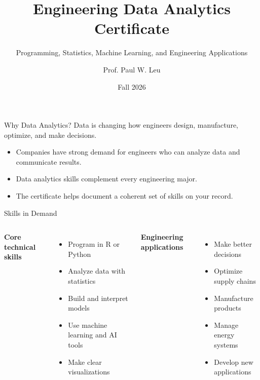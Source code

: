 \documentclass[aspectratio=169,11pt,t]{beamer}
\title[Engineering Data Analytics Certificate]{Engineering Data Analytics Certificate}
\subtitle{Programming, Statistics, Machine Learning, and Engineering Applications}
\author{Prof. Paul W. Leu}
\institute{University of Pittsburgh}
\date{Fall 2026}
\newcommand{\smallitem}{\setlength\itemsep{2pt}}
\newcommand{\tightitems}{\setlength\itemsep{1pt}\setlength\parskip{0pt}}
\begin{document}
\begin{frame}[t]
  \titlepage
\end{frame}

\begin{frame}[t]{Why Data Analytics?}
\large
Data is changing how engineers design, manufacture, optimize, and make decisions.

\vspace{0.35cm}
\begin{itemize}[<+->]
  \smallitem
  \item Companies have strong demand for engineers who can analyze data and communicate results.
  \item Data analytics skills complement every engineering major.
  \item The certificate helps document a coherent set of skills on your record.
\end{itemize}

\vspace{0.35cm}
\end{frame}

\begin{frame}[t]{Skills in Demand}
\begin{columns}[T,onlytextwidth]
\textbf{Core technical skills}
\begin{itemize}[<+->]
  \tightitems
  \item Program in R or Python
  \item Analyze data with statistics
  \item Build and interpret models
  \item Use machine learning and AI tools
  \item Make clear visualizations
\end{itemize}

\textbf{Engineering applications}
\begin{itemize}[<+->]
  \tightitems
  \item Make better decisions
  \item Optimize supply chains
  \item Manufacture products
  \item Manage energy systems
  \item Develop new applications
\end{itemize}
\end{columns}
\end{frame}
\end{document}
